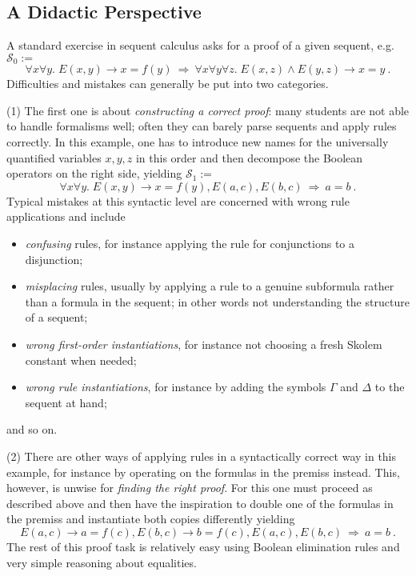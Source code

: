 \documentclass[a4paper,UKenglish]{lipics}
\newcommand{\imp}{\ensuremath{\rightarrow}}
\newcommand{\yields}{\ensuremath{\Longrightarrow}}
\begin{document}
\subsection{A Didactic Perspective}
\label{didactics}

A standard exercise in sequent calculus asks for a proof of a given sequent, e.g.\ $\mathcal{S}_0 :=$
\begin{displaymath}
\forall x\forall y.\; E(x,y) \imp x = f(y) ~ \yields ~ \forall x\forall y\forall z.\; E(x,z) \wedge E(y,z) \imp x = y\ .
\end{displaymath}
Difficulties and mistakes can generally be put into two categories. 
\medskip

(1) The first one is about \emph{constructing a correct proof}: many students are not able to handle formalisms well; often they can barely parse  
sequents and apply rules correctly. In this example, one has to introduce new names for the universally quantified variables $x,y,z$ in this order and 
then decompose the Boolean operators on the right side, yielding $\mathcal{S}_1 :=$
\begin{displaymath}
\forall x\forall y.\; E(x,y) \imp x = f(y), E(a,c), E(b,c) ~ \yields ~  a = b\ .
\end{displaymath}
Typical mistakes at this syntactic level are concerned with wrong rule applications and include 
\begin{itemize}
\item \emph{confusing} rules, for instance applying the rule for conjunctions to a disjunction;
\item \emph{misplacing} rules, usually by applying a rule to a genuine subformula rather than a formula in the sequent; in other words not
      understanding the structure of a sequent;
\item \emph{wrong first-order instantiations}, for instance not choosing a fresh Skolem constant when needed;
\item \emph{wrong rule instantiations}, for instance by adding the symbols $\Gamma$ and $\Delta$ to the sequent at hand; 
\end{itemize}
and so on.
\medskip

(2) There are other ways of applying rules in a syntactically correct way in this example, for instance by operating on the formulas in the premiss 
instead. This, however, is unwise for \emph{finding the right proof}. For this one must proceed as described above and then have the inspiration to 
double one of the formulas in the premiss and instantiate both copies differently yielding
\begin{displaymath}
E(a,c) \imp a = f(c), E(b,c) \imp b = f(c), E(a,c), E(b,c) ~ \yields ~  a = b\ .
\end{displaymath}
The rest of this proof task is relatively easy using Boolean elimination rules and very simple reasoning about equalities. 
\medskip
\end{document}

